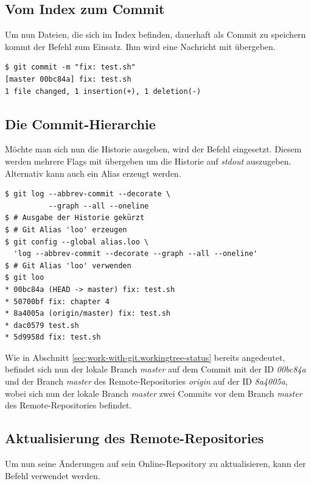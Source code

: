 \subsection{Vom Index zum Commit}
\label{sec:work-with-git.index-to-commit}
Um nun Dateien, die sich im Index befinden, dauerhaft als Commit zu speichern kommt der Befehl \textit{} zum Einsatz. Ihm wird eine Nachricht mit übergeben.

\begin{verbatim}
$ git commit -m "fix: test.sh"
[master 00bc84a] fix: test.sh
1 file changed, 1 insertion(+), 1 deletion(-)
\end{verbatim}

\subsection{Die Commit-Hierarchie}
\label{sec:work-with-git.log-hierarchie}
Möchte man sich nun die Historie ausgeben, wird der Befehl  \textit{} eingesetzt. Diesem werden mehrere Flags mit übergeben um die Historie auf \textit{stdout} auszugeben. Alternativ kann auch ein Alias erzeugt werden.

\begin{verbatim}
$ git log --abbrev-commit --decorate \
          --graph --all --oneline
$ # Ausgabe der Historie gekürzt
$ # Git Alias 'loo' erzeugen
$ git config --global alias.loo \ 
  'log --abbrev-commit --decorate --graph --all --oneline'
$ # Git Alias 'loo' verwenden
$ git loo
* 00bc84a (HEAD -> master) fix: test.sh
* 50700bf fix: chapter 4
* 8a4005a (origin/master) fix: test.sh
* dac0579 test.sh
* 5d9958d fix: test.sh
\end{verbatim}

Wie in Abschnitt \ref{sec;work-with-git.workingtree-status} bereits angedeutet, befindet sich nun der lokale Branch \textit{master} auf dem Commit mit der ID \textit{00bc84a} und der Branch \textit{master} des Remote-Repositories \textit{origin} auf der ID \textit{8a4005a}, wobei sich nun der lokale Branch \textit{master} zwei Commits vor dem Branch \textit{master} des Remote-Repositories befindet.

\subsection{Aktualisierung des Remote-Repositories}
\label{sec:work-with-git.update-online-repo}
Um nun seine Änderungen auf sein Online-Repository zu aktualisieren, kann der Befehl \textit{} verwendet werden. 

